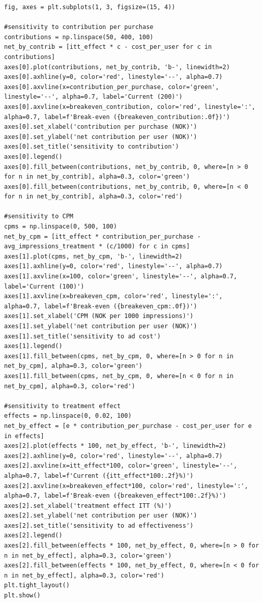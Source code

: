 \documentclass[10pt]{article}
\begin{document}
\begin{lstlisting}
fig, axes = plt.subplots(1, 3, figsize=(15, 4))

#sensitivity to contribution per purchase
contributions = np.linspace(50, 400, 100)
net_by_contrib = [itt_effect * c - cost_per_user for c in contributions]
axes[0].plot(contributions, net_by_contrib, 'b-', linewidth=2)
axes[0].axhline(y=0, color='red', linestyle='--', alpha=0.7)
axes[0].axvline(x=contribution_per_purchase, color='green', linestyle='--', alpha=0.7, label='Current (200)')
axes[0].axvline(x=breakeven_contribution, color='red', linestyle=':', alpha=0.7, label=f'Break-even ({breakeven_contribution:.0f})')
axes[0].set_xlabel('contribution per purchase (NOK)')
axes[0].set_ylabel('net contribution per user (NOK)')
axes[0].set_title('sensitivity to contribution')
axes[0].legend()
axes[0].fill_between(contributions, net_by_contrib, 0, where=[n > 0 for n in net_by_contrib], alpha=0.3, color='green')
axes[0].fill_between(contributions, net_by_contrib, 0, where=[n < 0 for n in net_by_contrib], alpha=0.3, color='red')

#sensitivity to CPM
cpms = np.linspace(0, 500, 100)
net_by_cpm = [itt_effect * contribution_per_purchase - avg_impressions_treatment * (c/1000) for c in cpms]
axes[1].plot(cpms, net_by_cpm, 'b-', linewidth=2)
axes[1].axhline(y=0, color='red', linestyle='--', alpha=0.7)
axes[1].axvline(x=100, color='green', linestyle='--', alpha=0.7, label='Current (100)')
axes[1].axvline(x=breakeven_cpm, color='red', linestyle=':', alpha=0.7, label=f'Break-even ({breakeven_cpm:.0f})')
axes[1].set_xlabel('CPM (NOK per 1000 impressions)')
axes[1].set_ylabel('net contribution per user (NOK)')
axes[1].set_title('sensitivity to ad cost')
axes[1].legend()
axes[1].fill_between(cpms, net_by_cpm, 0, where=[n > 0 for n in net_by_cpm], alpha=0.3, color='green')
axes[1].fill_between(cpms, net_by_cpm, 0, where=[n < 0 for n in net_by_cpm], alpha=0.3, color='red')

#sensitivity to treatment effect
effects = np.linspace(0, 0.02, 100)
net_by_effect = [e * contribution_per_purchase - cost_per_user for e in effects]
axes[2].plot(effects * 100, net_by_effect, 'b-', linewidth=2)
axes[2].axhline(y=0, color='red', linestyle='--', alpha=0.7)
axes[2].axvline(x=itt_effect*100, color='green', linestyle='--', alpha=0.7, label=f'Current ({itt_effect*100:.2f}%)')
axes[2].axvline(x=breakeven_effect*100, color='red', linestyle=':', alpha=0.7, label=f'Break-even ({breakeven_effect*100:.2f}%)')
axes[2].set_xlabel('treatment effect ITT (%)')
axes[2].set_ylabel('net contribution per user (NOK)')
axes[2].set_title('sensitivity to ad effectiveness')
axes[2].legend()
axes[2].fill_between(effects * 100, net_by_effect, 0, where=[n > 0 for n in net_by_effect], alpha=0.3, color='green')
axes[2].fill_between(effects * 100, net_by_effect, 0, where=[n < 0 for n in net_by_effect], alpha=0.3, color='red')
plt.tight_layout()
plt.show()
\end{lstlisting}
\end{document}
